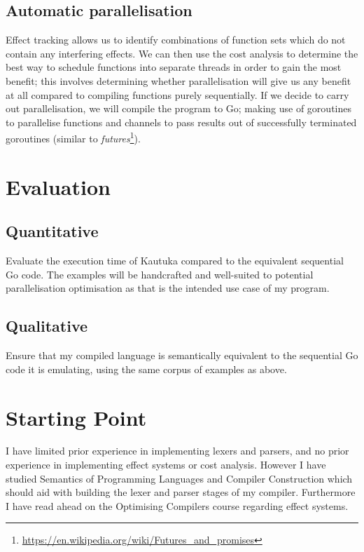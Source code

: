 \begin{refsection}
  \subsection*{Automatic parallelisation}

  Effect tracking allows us to identify combinations of function sets which do not contain any interfering effects. We can then use the cost analysis to determine the best way to schedule functions into separate threads in order to gain the most benefit; this involves determining whether parallelisation will give us any benefit at all compared to compiling functions purely sequentially. If we decide to carry out parallelisation, we will compile the program to Go; making use of goroutines to parallelise functions and channels to pass results out of successfully terminated goroutines (similar to \textit{futures}\footnote{\url{https://en.wikipedia.org/wiki/Futures_and_promises}}).

  \section{Evaluation}

  \subsection*{Quantitative}
  Evaluate the execution time of Kautuka compared to the equivalent sequential Go code. The examples will be handcrafted and well-suited to potential parallelisation optimisation as that is the intended use case of my program.

  \subsection*{Qualitative}
  Ensure that my compiled language is semantically equivalent to the sequential Go code it is emulating, using the same corpus of examples as above.

  \section{Starting Point}

  I have limited prior experience in implementing lexers and parsers, and no prior experience in implementing effect systems or cost analysis. However I have studied Semantics of Programming Languages and Compiler Construction which should aid with building the lexer and parser stages of my compiler. Furthermore I have read ahead on the Optimising Compilers course regarding effect systems.


\end{refsection}
